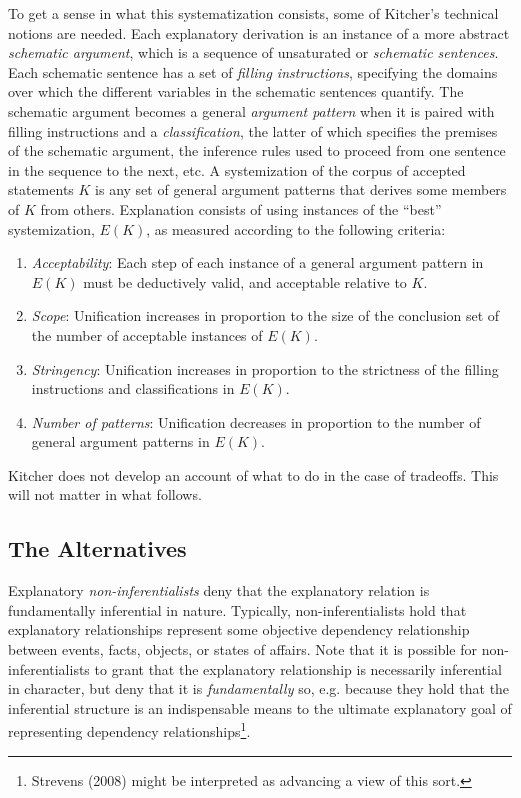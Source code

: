 \documentclass{svjour3}                     %
\begin{document}
To get a sense in what this systematization consists, some of Kitcher's technical notions are needed. Each explanatory derivation is an instance of a more abstract \textit{schematic argument}, which is a sequence of unsaturated or \textit{schematic sentences}. Each schematic sentence has a set of \textit{filling instructions}, specifying the domains over which the different variables in the schematic sentences quantify. The schematic argument becomes a general \textit{argument pattern} when it is paired with filling instructions and a \textit{classification}, the latter of which specifies the premises of the schematic argument, the inference rules used to proceed from one sentence in the sequence to the next, etc.
A systemization of the corpus of accepted statements $K$ is any set of general argument patterns that derives some members of $K$ from others. Explanation consists of using instances of the ``best'' systemization, $E(K)$, as measured according to the following criteria:
\begin{enumerate}
	\item \textit{Acceptability}: Each step of each instance of a general argument pattern in $E(K)$ must be deductively valid, and acceptable relative to $K$.
	\item \textit{Scope}: Unification increases in proportion to the size of the conclusion set of the number of acceptable instances of $E(K)$.
	\item \textit{Stringency}: Unification increases in proportion to the strictness of the filling instructions and classifications in $E(K)$.
	\item \textit{Number of patterns}: Unification decreases in proportion to the number of general argument patterns in $E(K)$.
\end{enumerate}
Kitcher does not develop an account of what to do in the case of tradeoffs. This will not matter in what follows.


\subsection{The Alternatives}
\label{subsec:alternatives}
Explanatory \textit{non-inferentialists} deny that the explanatory relation is fundamentally inferential in nature. Typically, non-inferentialists hold that explanatory relationships represent some objective dependency relationship between events, facts, objects, or states of affairs. Note that it is possible for non-inferentialists to grant that the explanatory relationship is necessarily inferential in character, but deny that it is \textit{fundamentally} so, e.g. because they hold that the inferential structure is an indispensable means to the ultimate explanatory goal of representing dependency relationships\footnote{Strevens (2008) might be interpreted as advancing a view of this sort.}. 
\end{document}
